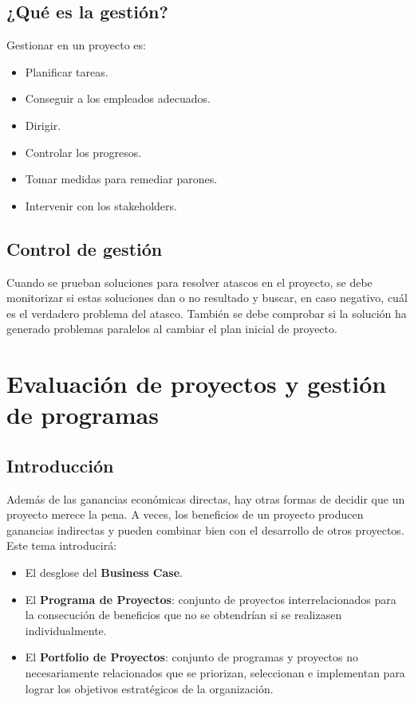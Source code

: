 \documentclass[12pt]{article}
\begin{document}
\subsection{¿Qué es la gestión?}
\label{1.13.0}

{Gestionar en un proyecto es:}

\begin{itemize}
    \item {Planificar tareas.}
    \item {Conseguir a los empleados adecuados.}
    \item {Dirigir.}
    \item {Controlar los progresos.}
    \item {Tomar medidas para remediar parones.}
    \item {Intervenir con los stakeholders.}
\end{itemize}

\subsection{Control de gestión}
\label{1.14.0}

{Cuando se prueban soluciones para resolver atascos en el proyecto, se debe monitorizar si estas soluciones dan o no resultado y buscar, en caso negativo, cuál es el verdadero problema del atasco. También se debe comprobar si la solución ha generado problemas paralelos al cambiar el plan inicial de proyecto.}

\newpage

\section{Evaluación de proyectos y gestión de programas}
\label{2.0.0}
\subsection{Introducción}
\label{2.1.0}

{Además de las ganancias económicas directas, hay otras formas de decidir que un proyecto merece la pena. A veces, los beneficios de un proyecto producen ganancias indirectas y pueden combinar bien con el desarrollo de otros proyectos.}\\

{Este tema introducirá:}
\begin{itemize}
    \item {El desglose del \textbf{Business Case}.}
    \item {El \textbf{Programa de Proyectos}: conjunto de proyectos interrelacionados para la consecución de beneficios que no se obtendrían si se realizasen individualmente.}
    \item {El \textbf{Portfolio de Proyectos}: conjunto de programas y proyectos no necesariamente relacionados que se priorizan, seleccionan e implementan para lograr los objetivos estratégicos de la organización.}
\end{itemize}
\end{document}
